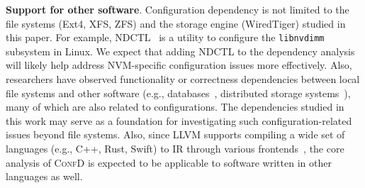 \vspace{0.05in}
\noindent
{\bf Support for other software}.
Configuration dependency is not limited to the  file systems (Ext4, XFS, ZFS) and  the storage engine (WiredTiger) studied in this paper.
For example, NDCTL~\cite{ndctl} is a utility to configure the \texttt{libnvdimm} subsystem in Linux.
We expect that adding NDCTL to the dependency analysis  will likely help address NVM-specific configuration issues more effectively.
Also, researchers   have observed functionality or correctness dependencies between local file systems and other software  
(e.g.,  databases~\cite{Zheng-OSDI14-DB}, distributed storage systems~\cite{Jinrui-ICS18,RedundancyDoesNotImplyFaultTolerance-FAST17,Runzhou-TOS22,Runzhou-PDSW20}), 
many of which are also related to  configurations. 
The  dependencies studied in this work   may serve as a foundation for investigating such configuration-related 
issues beyond file systems.
Also, since LLVM supports compiling a wide set of languages (e.g.,  C++, Rust, Swift) to IR through various frontends~\cite{LLVM},
the core analysis of \textsc{ConfD} is expected to be applicable to software written in other languages as well.  
